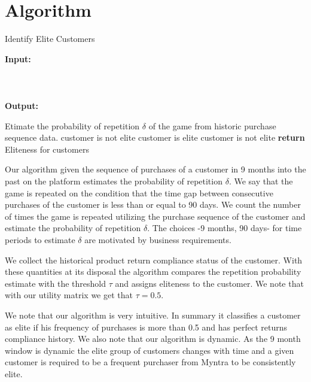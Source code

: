\section{Algorithm}
\label{algorithm}
\begin{algorithm}[ht]
\caption{Identify Elite Customers}
\begin{flushleft}
\textbf{Input:}\\ 
\\ 
 \\  
\\
\textbf{Output:} \\ 
\end{flushleft}
\begin{algorithmic}[1]
\State Etimate the probability of repetition $\delta$ of the game from historic purchase sequence data.
\If{$\delta <\tau$} 
{customer is not elite}
\Else{}
    {customer is elite}
    \Else
        { customer is not elite}
    \EndIf
\EndIf
\EndFor
\State \textbf{return} Eliteness for customers 
\EndProcedure
\end{algorithmic}
\label{alg:Classify}
\end{algorithm}
Our algorithm given the sequence of purchases of a customer in 9 months into the past on the  platform estimates the probability of repetition $\delta$. We say that the game is repeated on the condition that the time gap between consecutive purchases of the customer is less than or equal to 90 days. We count the number of times the game is repeated utilizing the purchase sequence of the customer and estimate the probability of repetition $\delta$. The choices -9 months, 90 days- for time periods to estimate $\delta$ are motivated by business requirements.

We collect the historical product return compliance status of the customer. With these quantities at its disposal the algorithm compares the repetition probability estimate with the threshold $\tau$ and assigns eliteness to the customer. We note that with our utility matrix we get that $\tau = 0.5$.

We note that our algorithm is very intuitive. In summary it classifies a customer as elite if his frequency of purchases is more than 0.5 and has perfect returns compliance history. We also note that our algorithm is dynamic. As the 9 month window is dynamic the elite group of customers changes with time and a given customer is required to be a frequent purchaser from Myntra to be consistently elite.
